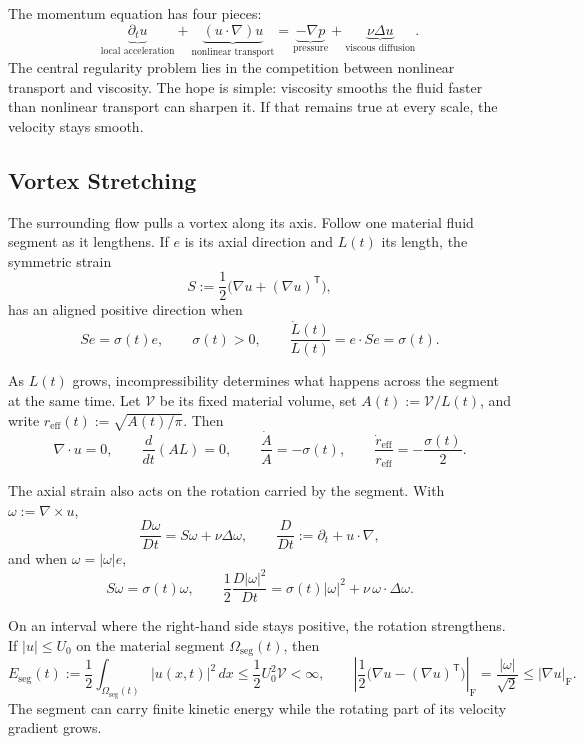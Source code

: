 
The momentum equation has four pieces:
\[
  \underbrace{\partial_t u}_{\text{local acceleration}}
  +
  \underbrace{(u\cdot\nabla)u}_{\text{nonlinear transport}}
  =
  \underbrace{-\nabla p}_{\text{pressure}}
  +
  \underbrace{\nu\Delta u}_{\text{viscous diffusion}}.
\]
The central regularity problem lies in the competition between nonlinear transport and viscosity.
The hope is simple: viscosity smooths the fluid faster than nonlinear transport can sharpen it.
If that remains true at every scale, the velocity stays smooth.

\subsection{Vortex Stretching}\label{sub:ThePerfectlyStretchingVortex}

The surrounding flow pulls a vortex along its axis.
Follow one material fluid segment as it lengthens.
If \(e\) is its axial direction and \(L(t)\) its length, the symmetric strain
\[
  S:=\frac12\bigl(\nabla u+(\nabla u)^{\mathsf T}\bigr),
\]
has an aligned positive direction when
\[
  Se=\sigma(t)e,
  \qquad
  \sigma(t)>0,
  \qquad
  \frac{\dot L(t)}{L(t)}
  =
  e\cdot Se
  =
  \sigma(t).
\]

As \(L(t)\) grows, incompressibility determines what happens across the segment at the same time.
Let \(\mathcal V\) be its fixed material volume, set \(A(t):=\mathcal V/L(t)\), and write \(r_{\mathrm{eff}}(t):=\sqrt{A(t)/\pi}\).
Then
\[
  \nabla\cdot u=0,
  \qquad
  \frac{d}{dt}(A L)=0,
  \qquad
  \frac{\dot A}{A}=-\sigma(t),
  \qquad
  \frac{\dot r_{\mathrm{eff}}}{r_{\mathrm{eff}}}
  =
  -\frac{\sigma(t)}{2}.
\]

The axial strain also acts on the rotation carried by the segment.
With \(\omega:=\nabla\times u\),
\[
  \frac{D\omega}{Dt}
  =
  S\omega+\nu\Delta\omega,
  \qquad
  \frac{D}{Dt}
  :=
  \partial_t+u\cdot\nabla,
\]
and when \(\omega=|\omega|e\),
\[
  S\omega
  =
  \sigma(t)\omega,
  \qquad
  \frac12\frac{D|\omega|^2}{Dt}
  =
  \sigma(t)|\omega|^2
  +
  \nu\,\omega\cdot\Delta\omega.
\]

On an interval where the right-hand side stays positive, the rotation strengthens.
If \(|u|\leq U_0\) on the material segment \(\Omega_{\mathrm{seg}}(t)\), then
\[
  E_{\mathrm{seg}}(t)
  :=
  \frac12\int_{\Omega_{\mathrm{seg}}(t)}|u(x,t)|^2\,dx
  \leq
  \frac12U_0^2\mathcal V
  <
  \infty,
  \qquad
  \left|\frac12\bigl(\nabla u-(\nabla u)^{\mathsf T}\bigr)\right|_{\mathrm F}
  =
  \frac{|\omega|}{\sqrt2}
  \leq
  |\nabla u|_{\mathrm F}.
\]
The segment can carry finite kinetic energy while the rotating part of its velocity gradient grows.

